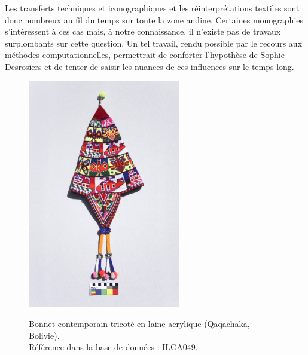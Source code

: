 Les transferts techniques et iconographiques et les réinterprétations textiles sont donc nombreux au fil du temps sur toute la zone andine. Certaines monographies s'intéressent à ces cas mais, à notre connaissance, il n'existe pas de travaux surplombants sur cette question. Un tel travail, rendu possible par le recours aux méthodes computationnelles, permettrait de conforter l'hypothèse de Sophie Desrosiers et de tenter de saisir les nuances de ces influences sur le temps long.

\begin{figure}[!h]
    \begin{minipage}[c]{.5\linewidth}
            \begin{center}
                \includegraphics[height=10cm]{../images/ILCA049.jpg}
                 \caption{Bonnet contemporain tricoté en laine acrylique (Qaqachaka, Bolivie).\\ Référence dans la base de données : ILCA049.}
            \end{center}
    \label{fig:ILCA049}
    \end{minipage}
    \hspace{5pt}
    \begin{minipage}[c]{.5\linewidth}
        \begin{center}

\end{center}
\end{minipage}
\end{figure}
